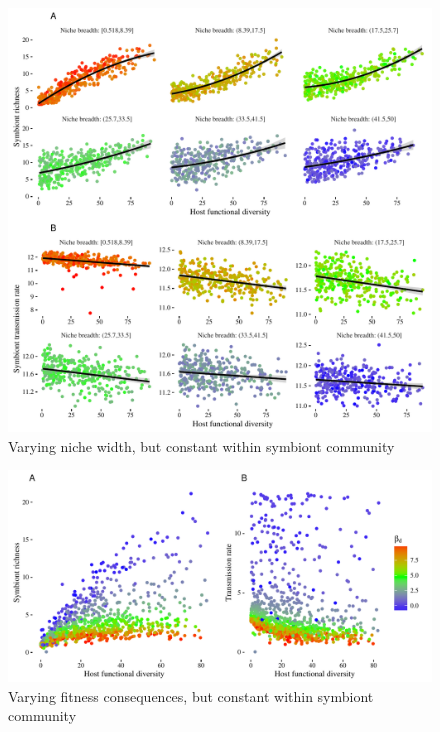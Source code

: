 \documentclass[12pt]{article}
\begin{document}
\newpage

\begin{figure}[ht]\centering
\includegraphics[width=\linewidth]{fig/fig2.pdf}
\caption{Varying niche width, but constant within symbiont community}
\label{f3}
\end{figure}

\newpage

\begin{figure}[ht]\centering
\includegraphics[width=\linewidth]{fig/fig3.pdf}
\caption{Varying fitness consequences, but constant within symbiont community}
\label{f4}
\end{figure}

\newpage
\end{document}
